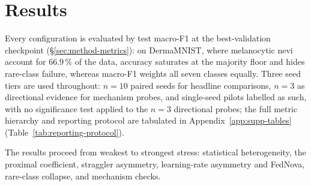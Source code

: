 \documentclass[11pt,a4paper]{report}
\begin{document}



\chapter{Results}
\label{ch:results}




Every configuration is evaluated by test macro-F1 at the best-validation checkpoint
(\S\ref{sec:method-metrics}): on DermaMNIST, where melanocytic nevi account for
$66.9\,\%$ of the data, accuracy saturates at the
majority floor and hides rare-class failure, whereas macro-F1 weights all seven
classes equally. Three seed tiers are used throughout: $n=10$ paired seeds for
headline comparisons, $n=3$ as directional evidence for mechanism probes, and
single-seed pilots labelled as such, with no significance test applied to the
$n=3$ directional probes; the full metric hierarchy and reporting protocol are
tabulated in Appendix~\ref{app:supp-tables} (Table~\ref{tab:reporting-protocol}).

The results proceed from weakest to strongest stress: statistical heterogeneity,
the proximal coefficient, straggler asymmetry, learning-rate asymmetry and FedNova,
rare-class collapse, and mechanism checks.



\end{document}
